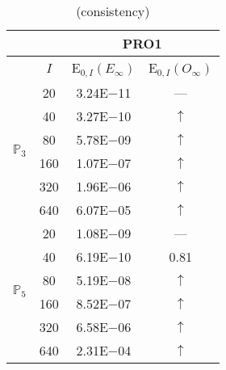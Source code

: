 \begin{table}[H]
\caption{(consistency)}
\setlength{\tabcolsep}{5pt}
\centering
\begin{tabular}{@{}l c c c@{}}
\toprule
 &  & \multicolumn{2}{c}{PRO1}\\
\midrule
 & $I$ & E$_{0,I}(E_{\infty})$ & E$_{0,I}(O_{\infty})$\\
\midrule
\multirow{6}{*}{$\mathbb{P}_{3}$}
 & 20 & 3.24E$-$11 & ---\\
 & 40 & 3.27E$-$10 & $\uparrow$\\
 & 80 & 5.78E$-$09 & $\uparrow$\\
 & 160 & 1.07E$-$07 & $\uparrow$\\
 & 320 & 1.96E$-$06 & $\uparrow$\\
 & 640 & 6.07E$-$05 & $\uparrow$\\
\midrule
\multirow{6}{*}{$\mathbb{P}_{5}$}
 & 20 & 1.08E$-$09 & ---\\
 & 40 & 6.19E$-$10 & 0.81\\
 & 80 & 5.19E$-$08 & $\uparrow$\\
 & 160 & 8.52E$-$07 & $\uparrow$\\
 & 320 & 6.58E$-$06 & $\uparrow$\\
 & 640 & 2.31E$-$04 & $\uparrow$\\
\bottomrule
\end{tabular}
\label{Table:PRO:test_01_01_test47_pro1}
\end{table}
